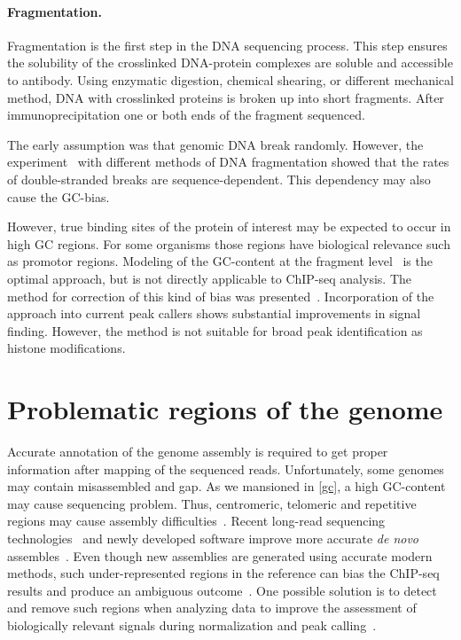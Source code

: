 \paragraph{Fragmentation.}
Fragmentation is the first step in the DNA sequencing process.
This step ensures the solubility of the crosslinked DNA-protein complexes are soluble and accessible to antibody.
Using enzymatic digestion, chemical shearing, or different mechanical method, DNA with crosslinked proteins is broken up into short fragments.
After immunoprecipitation one or both ends of the fragment sequenced.

The early assumption was that genomic DNA break randomly.
However, the experiment~\cite{poptsova2014non} with different methods of DNA fragmentation showed that the rates of double-stranded breaks are sequence-dependent.
This dependency may also cause the GC-bias. 

However, true binding sites of the protein of interest may be expected to occur in high GC regions.
For some organisms those regions have biological relevance such as promotor regions.
Modeling of the GC-content at the fragment level~\cite{benjamini2012summarizing} is the optimal approach, but is not directly applicable to ChIP-seq analysis.
The method for correction of this kind of bias was presented~\cite{teng2017accounting}.
Incorporation of the approach into current peak callers shows substantial improvements in signal finding.
However, the method is not suitable for broad peak identification as histone modifications.


 \section{Problematic regions of the genome}

 Accurate annotation of the genome assembly is required to get proper information after mapping of the sequenced reads. 
 Unfortunately, some genomes may contain misassembled and gap.
 As we mansioned in \ref{gc}, a high GC-content may cause sequencing problem.
 Thus, centromeric, telomeric and repetitive regions may cause assembly difficulties~\cite{amemiya2019encode, liao2019current}.
 Recent long-read sequencing technologies~\cite{feng2015nanopore} and newly developed software improve more accurate \textit{de novo} assembles~\cite{rice2019new}. 
 Even though new assemblies are generated using accurate modern methods, such under-represented regions in the reference can bias the ChIP-seq results and produce an ambiguous outcome~\cite{carroll2014impact}. 
 One possible solution is to detect and remove such regions when analyzing data to improve the assessment of biologically relevant signals during normalization and peak calling~\cite{amemiya2019encode}. 


